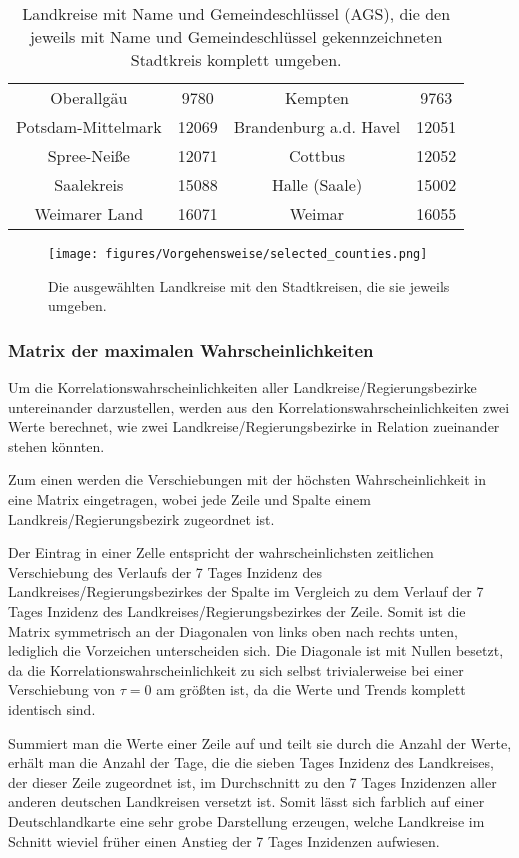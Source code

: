 \begin{table}[H]
\begin{tabular}{c|c|c|c}
\begin{comment}
\end{comment}
Oberallgäu & 9780 & Kempten & 9763 \\\hdashline
Potsdam-Mittelmark & 12069 & Brandenburg a.d. Havel & 12051 \\\hdashline
Spree-Neiße & 12071 & Cottbus & 12052 \\\hdashline
Saalekreis & 15088 & Halle (Saale) & 15002 \\\hdashline
Weimarer Land & 16071 & Weimar & 16055
    \end{tabular}
    \caption{Landkreise mit Name und Gemeindeschlüssel (AGS), die den jeweils mit Name und Gemeindeschlüssel gekennzeichneten Stadtkreis komplett umgeben.}
    \label{tab:landkreise_um_städte}
\end{table}

\begin{figure}[H]
    \centering
    \texttt{[image: figures/Vorgehensweise/selected\_counties.png]}
    \caption{Die ausgewählten Landkreise mit den Stadtkreisen, die sie jeweils umgeben.}
    \label{fig:selected_counties}
\end{figure}

\subsubsection{Matrix der maximalen Wahrscheinlichkeiten}
Um die Korrelationswahrscheinlichkeiten aller Landkreise/Regierungsbezirke untereinander darzustellen, werden aus den Korrelationswahrscheinlichkeiten zwei Werte berechnet, wie zwei Landkreise/Regierungsbezirke in Relation zueinander stehen könnten.

Zum einen werden die Verschiebungen mit der höchsten Wahrscheinlichkeit in eine Matrix eingetragen, wobei jede Zeile und Spalte einem Landkreis/Regierungsbezirk zugeordnet ist.

Der Eintrag in einer Zelle entspricht der wahrscheinlichsten zeitlichen Verschiebung des Verlaufs der 7 Tages Inzidenz des Landkreises/Regierungsbezirkes der Spalte im Vergleich zu dem Verlauf der 7 Tages Inzidenz des Landkreises/Regierungsbezirkes der Zeile.
Somit ist die Matrix symmetrisch an der Diagonalen von links oben nach rechts unten, lediglich die Vorzeichen unterscheiden sich. Die Diagonale ist mit Nullen besetzt, da die Korrelationswahrscheinlichkeit zu sich selbst trivialerweise bei einer Verschiebung von $\tau=0$ am größten ist, da die Werte und Trends komplett identisch sind.

Summiert man die Werte einer Zeile auf und teilt sie durch die Anzahl der Werte, erhält man die Anzahl der Tage, die die sieben Tages Inzidenz des Landkreises, der dieser Zeile zugeordnet ist, im Durchschnitt zu den 7 Tages Inzidenzen aller anderen deutschen Landkreisen versetzt ist.
Somit lässt sich farblich auf einer Deutschlandkarte eine sehr grobe Darstellung erzeugen, welche Landkreise im Schnitt wieviel früher einen Anstieg der 7 Tages Inzidenzen aufwiesen.

